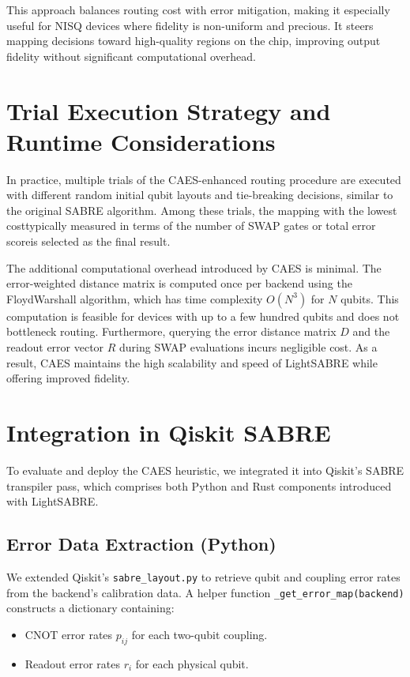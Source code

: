 \documentclass[conference]{IEEEtran}
\begin{document}
This approach balances routing cost with error mitigation, making it especially useful for NISQ devices where fidelity is non-uniform and precious. It steers mapping decisions toward high-quality regions on the chip, improving output fidelity without significant computational overhead.


\section{Trial Execution Strategy and Runtime Considerations}

In practice, multiple trials of the CAES-enhanced routing procedure are executed with different random initial qubit layouts and tie-breaking decisions, similar to the original SABRE algorithm. Among these trials, the mapping with the lowest cost\textemdash typically measured in terms of the number of SWAP gates or total error score\textemdash is selected as the final result.

The additional computational overhead introduced by CAES is minimal. The error-weighted distance matrix is computed once per backend using the Floyd\textendash Warshall algorithm, which has time complexity $O(N^3)$ for $N$ qubits. This computation is feasible for devices with up to a few hundred qubits and does not bottleneck routing. Furthermore, querying the error distance matrix $D$ and the readout error vector $R$ during SWAP evaluations incurs negligible cost. As a result, CAES maintains the high scalability and speed of LightSABRE while offering improved fidelity.


\section{Integration in Qiskit SABRE}

To evaluate and deploy the CAES heuristic, we integrated it into Qiskit's SABRE transpiler pass, which comprises both Python and Rust components introduced with LightSABRE.

\subsection{Error Data Extraction (Python)}

We extended Qiskit’s \texttt{sabre\_layout.py} to retrieve qubit and coupling error rates from the backend's calibration data. A helper function \texttt{\_get\_error\_map(backend)} constructs a dictionary containing:
\begin{itemize}
    \item CNOT error rates $p_{ij}$ for each two-qubit coupling.
    \item Readout error rates $r_i$ for each physical qubit.
\end{itemize}
\end{document}
